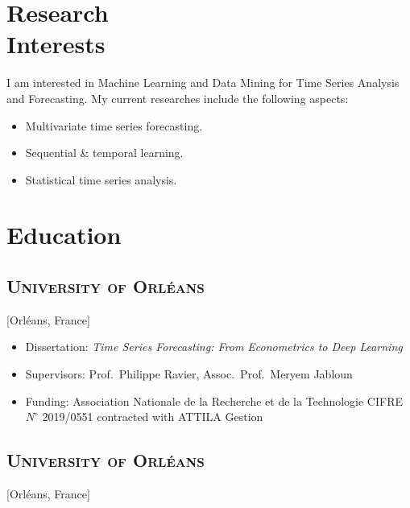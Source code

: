 \documentclass{mycv}
\begin{document}
\maketitle

\section{Research \\ Interests}

I am interested in Machine Learning and Data Mining for Time Series Analysis and Forecasting. My current researches include the following aspects:

\begin{itemize}
  \itemsep 0em
  \item Multivariate time series forecasting.
  \item Sequential \& temporal learning.
  \item Statistical time series analysis.
\end{itemize}

\vspace{-0.5em}

\section{Education}

\subsection{\scshape University of Orl\'eans}[Orl\'eans, France]

\begin{positions}
\end{positions}

\vspace{-\parskip}

\begin{itemize}[label={}]
  \itemsep 0em
  \item Dissertation: \textit{Time Series Forecasting: From Econometrics to Deep Learning}
  \item Supervisors: Prof.~Philippe Ravier, Assoc.~Prof.~Meryem Jabloun
  \item Funding: Association Nationale de la Recherche et de la Technologie CIFRE $N^{\circ}$ 2019/0551 contracted with ATTILA Gestion
\end{itemize}

\subsection{\scshape University of Orl\'eans}[Orl\'eans, France]
\end{document}
